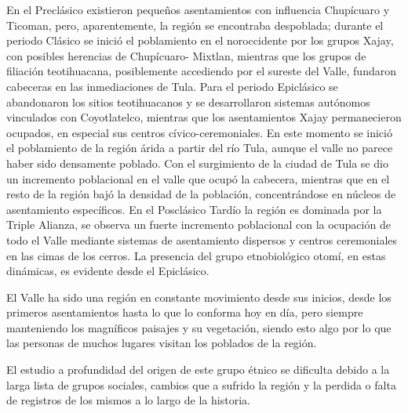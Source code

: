 \begin{center}
    \begin{minipage}{0.9\linewidth}
        \vspace{5pt}%
        {\small
En el Preclásico existieron pequeños asentamientos con influencia Chupícuaro y Ticoman, pero, aparentemente, la región se encontraba despoblada; durante el periodo Clásico se inició el poblamiento en el noroccidente por los grupos Xajay, con posibles herencias de Chupícuaro- Mixtlan, mientras que los grupos de filiación teotihuacana, posiblemente accediendo por el sureste del Valle, fundaron cabeceras en las inmediaciones de Tula. Para el periodo Epiclásico se abandonaron los sitios teotihuacanos y se desarrollaron sistemas autónomos vinculados con Coyotlatelco, mientras que los asentamientos Xajay permanecieron ocupados, en especial sus centros cívico-ceremoniales. En este momento se inició el poblamiento de la región árida a partir del río Tula, aunque el valle no parece haber sido densamente poblado. Con el surgimiento de la ciudad de Tula se dio un incremento poblacional en el valle que ocupó la cabecera, mientras que en el resto de la región bajó la densidad de la población, concentrándose en núcleos de asentamiento específicos. En el Posclásico Tardío la región es dominada por la Triple Alianza, se observa un fuerte incremento poblacional con la ocupación de todo el Valle mediante sistemas de asentamiento dispersos y centros ceremoniales en las cimas de los cerros. La presencia del grupo etnobiológico otomí, en estas dinámicas, es evidente desde el Epiclásico.
        }
        \begin{flushright}
            \citep[1]{aguilar2009}
        \end{flushright}
        \vspace{5pt}%
    \end{minipage}
\end{center}

El Valle ha sido una región en constante movimiento desde sus inicios, desde los primeros asentamientos hasta lo que lo conforma hoy en día, pero siempre manteniendo los magníficos paisajes y su vegetación, siendo esto algo por lo que las personas de muchos lugares visitan los poblados de la región.

El estudio a profundidad del origen de este grupo étnico se dificulta debido a la larga lista de grupos sociales, cambios que a sufrido la región y la perdida o falta de registros de los mismos a lo largo de la historia.

